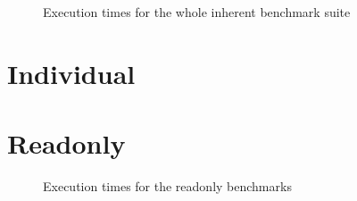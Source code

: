 \documentclass[12pt]{article}
\begin{document}
\MacroTableOverall

\begin{figure}
\begin{center}
\OverallPerfComparisonPlot
\end{center}
\vspace*{-5pt}
\caption{Execution times for the whole inherent benchmark suite}
\label{fig:perf-overview}
\end{figure}

\OverallTableSummary

\OverallTableOverall

\section{Individual}

\MopTableSummary

\MegamorphicTableSummary

\MopTableOverall

\MegaTableOverall

\section{Readonly}
\begin{figure}[ht]
\begin{center}
\ReadonlyPerfComparisonPlot
\end{center}
\vspace*{-5pt}
\caption{Execution times for the readonly benchmarks}
\label{fig:perf-overview}
\end{figure}

\ReadonlyTableSummary
\end{document}
